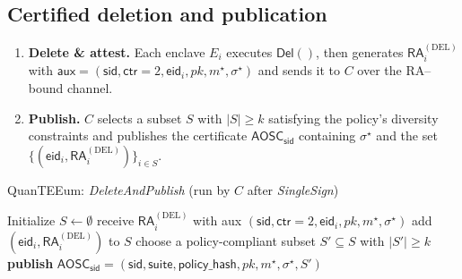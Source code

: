 \documentclass[runningheads,orivec]{llncs}
\newcommand{\prot}{\textsf{QuanTEEum}}
\newcommand{\sid}{\mathsf{sid}}
\begin{document}
\subsection{Certified deletion and publication}
\begin{enumerate}[leftmargin=*,itemsep=0.25em]
  \item \textbf{Delete \& attest.} Each enclave $E_i$ executes $\textsf{Del}()$, then generates
        $\mathsf{RA}^{(\mathrm{DEL})}_i$ with $\mathsf{aux}=(\sid,\mathsf{ctr}{=}2,\mathsf{eid}_i,pk,m^{\star},\sigma^{\star})$
        and sends it to $C$ over the RA–bound channel.
  \item \textbf{Publish.} $C$ selects a subset $S$ with $|S|\ge k$ satisfying the policy’s diversity constraints and publishes
        the certificate $\mathsf{AOSC}_\sid$ containing $\sigma^{\star}$ and the set $\{(\mathsf{eid}_i,\mathsf{RA}^{(\mathrm{DEL})}_i)\}_{i\in S}$.
\end{enumerate}

\begin{algorithm}[!htbp]
\caption{\prot{}: \emph{DeleteAndPublish} (run by $C$ after \emph{SingleSign})}
\label{alg:delete-publish}
\begin{small}
\begin{algorithmic}[1]
\State Initialize $S \gets \emptyset$
  \State receive $\mathsf{RA}^{(\mathrm{DEL})}_i$ with aux $(\sid,\mathsf{ctr}{=}2,\mathsf{eid}_i,pk,m^{\star},\sigma^{\star})$
  \State add $(\mathsf{eid}_i,\mathsf{RA}^{(\mathrm{DEL})}_i)$ to $S$
\EndFor
\State choose a policy-compliant subset $S' \subseteq S$ with $|S'|\ge k$
\State \textbf{publish} $\mathsf{AOSC}_\sid = (\sid,\mathsf{suite},\mathsf{policy\_hash},pk,m^{\star},\sigma^{\star},S')$
\end{algorithmic}
\end{small}
\end{algorithm}
\end{document}
